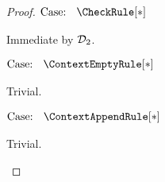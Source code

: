 \begin{proof}
    $\text{Case: }\begin{array}{c} \CheckRule[*] \end{array}$
    \begin{proofcase}
        Immediate by $\mathcal{D}_{2}$.
    \end{proofcase}

    $\text{Case: }\begin{array}{c} \ContextEmptyRule[*] \end{array}$
    \begin{proofcase}
        Trivial.
    \end{proofcase}

    $\text{Case: }\begin{array}{c} \ContextAppendRule[*] \end{array}$
    \begin{proofcase}
        Trivial.
    \end{proofcase}
\end{proof}
